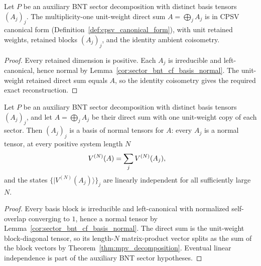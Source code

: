 \begin{lemma}%
    \label{thm:bnt_cf_basis_direct_sum_is_cpsv_cf}
    \leanok
    Let $P$ be an auxiliary BNT sector decomposition with distinct basis
    tensors $(A_j)_j$. The multiplicity-one unit-weight direct sum
    $A=\bigoplus_j A_j$ is in CPSV canonical form
    (Definition~\ref{def:cpsv_canonical_form}), with unit retained weights,
    retained blocks $(A_j)_j$, and the identity ambient coisometry.
\end{lemma}
\begin{proof}\leanok
    Every retained dimension is positive. Each $A_j$ is irreducible and
    left-canonical, hence normal by
    Lemma~\ref{cor:sector_bnt_cf_basis_normal}. The unit-weight retained
    direct sum equals $A$, so the identity coisometry gives the required exact
    reconstruction.
\end{proof}

\begin{lemma}%
    \label{thm:bnt_cf_basis_is_bnt_for_direct_sum}
    \leanok
    Let $P$ be an auxiliary BNT sector decomposition with distinct basis
    tensors $(A_j)_j$, and
    let $A=\bigoplus_j A_j$ be their direct sum with one unit-weight copy of
    each sector. Then $(A_j)_j$ is a basis of normal tensors for $A$: every
    $A_j$ is a normal tensor, at every positive system length $N$
    \begin{align}
        V^{(N)}(A)
         & =\sum_j V^{(N)}(A_j),
        \notag
    \end{align}
    and the states $\{|V^{(N)}(A_j)\rangle\}_j$ are linearly independent for
    all sufficiently large $N$.
\end{lemma}
\begin{proof}\leanok
    Every basis block is irreducible and left-canonical with normalized
    self-overlap converging to $1$, hence a normal tensor by
    Lemma~\ref{cor:sector_bnt_cf_basis_normal}. The direct sum is the
    unit-weight block-diagonal tensor, so its length-$N$ matrix-product vector
    splits as the sum of the block vectors by
    Theorem~\ref{thm:mpv_decomposition}. Eventual linear independence is part
    of the auxiliary BNT sector hypotheses.
\end{proof}

